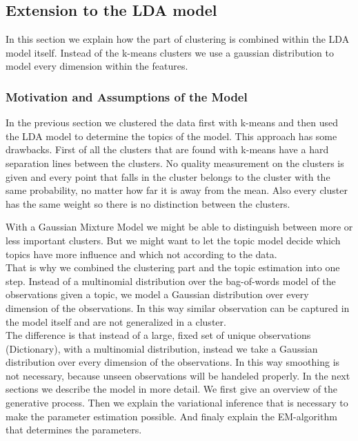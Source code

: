 \documentclass[11pt,a4paper]{article}
\begin{document}
\subsection{Extension to the LDA model}
In this section we explain how the part of clustering is combined within the LDA model itself. Instead of the k-means clusters we use a gaussian distribution to model every dimension within the features.


  \subsubsection{Motivation and Assumptions of the Model}
  
  In the previous section we clustered the data first with k-means and then used the LDA model to determine the topics of the model. This approach has some drawbacks. First of all the clusters that are found with k-means have a hard separation lines between the clusters. No quality measurement on the clusters is given and every point that falls in the cluster belongs to the cluster with the same probability, no matter how far it is away from the mean. Also every cluster has the same weight so there is no distinction between the clusters.

  With a Gaussian Mixture Model we might be able to distinguish between more or less important clusters. But we might want to let the topic model decide which topics have more influence and which not according to the data.\\
That is why we combined the clustering part and the topic estimation into one step. Instead of a multinomial distribution over the bag-of-words model of the observations given a topic, we model a Gaussian distribution over every dimension of the observations. In this way similar observation can be captured in the model itself and are not generalized in a cluster.\\
The difference is that instead of a large, fixed set of unique observations (Dictionary), with a multinomial distribution, instead we take a Gaussian distribution over every dimension of the observations. In this way smoothing is not necessary, because unseen observations will be handeled properly.
In the next sections we describe the model in more detail. We first give an overview of the generative process. Then we explain the variational inference that is necessary to make the parameter estimation possible. And finaly explain the EM-algorithm that determines the parameters.

\end{document}
